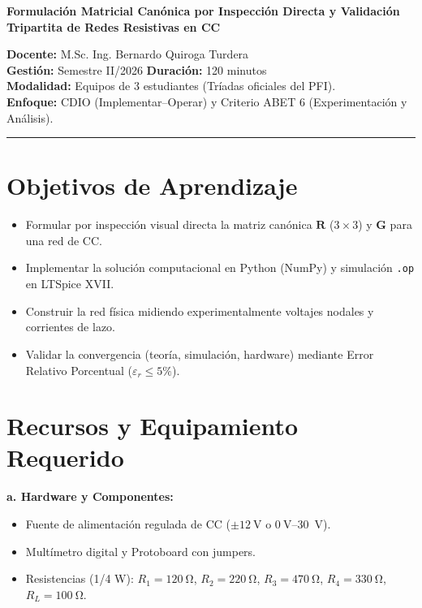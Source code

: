 \documentclass[11pt,a4paper]{article}
\begin{document}
\begin{center}
    \Large\textbf{Formulación Matricial Canónica por Inspección Directa y Validación Tripartita de Redes Resistivas en CC}
\end{center}

\vspace{0.3cm}

\noindent
\textbf{Docente:} M.Sc. Ing. Bernardo Quiroga Turdera \\
\textbf{Gestión:} Semestre II/2026 \hspace{2cm} \textbf{Duración:} 120 minutos \\
\textbf{Modalidad:} Equipos de 3 estudiantes (Tríadas oficiales del PFI). \\
\textbf{Enfoque:} CDIO (Implementar--Operar) y Criterio ABET 6 (Experimentación y Análisis).

\vspace{0.4cm}
\hrule
\vspace{0.4cm}

\section{Objetivos de Aprendizaje}
\begin{itemize}
    \item Formular por inspección visual directa la matriz canónica $\mathbf{R}$ ($3\times 3$) y $\mathbf{G}$ para una red de CC.
    \item Implementar la solución computacional en Python (NumPy) y simulación \texttt{.op} en LTSpice XVII.
    \item Construir la red física midiendo experimentalmente voltajes nodales y corrientes de lazo.
    \item Validar la convergencia (teoría, simulación, hardware) mediante Error Relativo Porcentual ($\varepsilon_r \le 5\%$).
\end{itemize}

\section{Recursos y Equipamiento Requerido}
\textbf{a. Hardware y Componentes:}
\begin{itemize}[label=\raisebox{0.25ex}{\tiny$\bullet$}]
    \item Fuente de alimentación regulada de CC ($\pm\qty{12}{\volt}$ o $\qty{0}{\volt}$--\qty{30}{\volt}).
    \item Multímetro digital y Protoboard con jumpers.
    \item Resistencias (1/4 W): $R_1 = \qty{120}{\ohm}$, $R_2 = \qty{220}{\ohm}$, $R_3 = \qty{470}{\ohm}$, $R_4 = \qty{330}{\ohm}$, $R_L = \qty{100}{\ohm}$.
\end{itemize}
\end{document}
